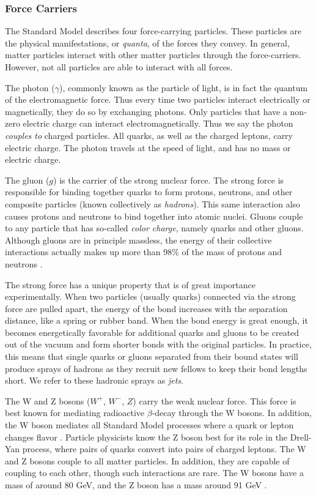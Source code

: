 \subsubsection*{Force Carriers}
The Standard Model describes four force-carrying particles. These
particles are the physical manifestations, or \emph{quanta}, of the forces
they convey. In general, matter particles interact with other matter
particles through the force-carriers. However, not all particles are
able to interact with all forces.


The photon ($\gamma$), commonly known as the particle of light,
is in fact the quantum of the electromagnetic
force. Thus every time two particles interact electrically or
magnetically, they do so by exchanging photons. Only particles that
have a non-zero electric charge can interact electromagnetically. Thus
we say the photon \emph{couples to} charged particles. All quarks, as
well as the charged leptons, carry electric charge. The photon travels
at the speed of light, and has no mass or electric charge.

The gluon ($g$) is the carrier of the strong nuclear force. The strong
force is responsible for binding together quarks to form protons,
neutrons, and other composite particles (known collectively as
\emph{hadrons}). This same interaction also causes protons and neutrons to
bind together into atomic nuclei. Gluons couple to any particle
that has so-called \emph{color charge}, namely quarks and
other gluons. Although gluons are in principle massless, the energy of
their collective interactions actually makes up more than 98\% of the
mass of protons and neutrons \cite{protonmass}.

The strong force has a unique property that is of great importance
experimentally. When two particles (usually quarks) connected via the
strong force are pulled apart, the energy of the bond increases with the separation
distance, like a spring or rubber band. When the bond energy is great
enough, it becomes energetically favorable for additional quarks and
gluons to be created out of the vacuum and form shorter bonds with the
original particles. In practice, this means that single quarks or
gluons separated from their bound states will produce sprays of
hadrons as they recruit new fellows to keep their bond lengths
short. We refer to these hadronic sprays as \emph{jets}.

The W and Z bosons ($W^+$, $W^-$, $Z$) carry the weak nuclear force. This
force is best known for mediating radioactive $\beta$-decay through
the W bosons. In addition, the W boson mediates all Standard Model
processes where a quark or lepton changes flavor \cite{griffiths}.
Particle physicists know the Z boson best for its
role in the Drell-Yan process, where pairs of quarks convert into
pairs of charged leptons. The W and Z bosons couple to all matter
particles. In addition, they are capable of coupling to each other,
though such interactions are rare. The W bosons have a mass of around
80 GeV, and the Z boson has a mass around 91 GeV \cite{pdg}.

